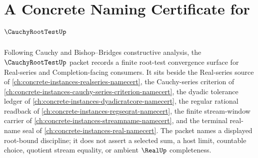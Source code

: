 \chapter{A Concrete Naming Certificate for $\CauchyRootTestUp$}
\label{ch:concrete-instances-cauchy-root-test-namecert}

Following Cauchy and Bishop--Bridges constructive analysis, the $\CauchyRootTestUp$ packet records a finite root-test convergence surface for Real-series and Completion-facing consumers. It sits beside the Real-series source of \autoref{ch:concrete-instances-realseries-namecert}, the Cauchy-series criterion of \autoref{ch:concrete-instances-cauchy-series-criterion-namecert}, the dyadic tolerance ledger of \autoref{ch:concrete-instances-dyadicratcore-namecert}, the regular rational readback of \autoref{ch:concrete-instances-regseqrat-namecert}, the finite stream-window carrier of \autoref{ch:concrete-instances-streamname-namecert}, and the terminal real-name seal of \autoref{ch:concrete-instances-real-namecert}. The packet names a displayed root-bound discipline; it does not assert a selected sum, a host limit, countable choice, quotient stream equality, or ambient $\RealUp$ completeness.

